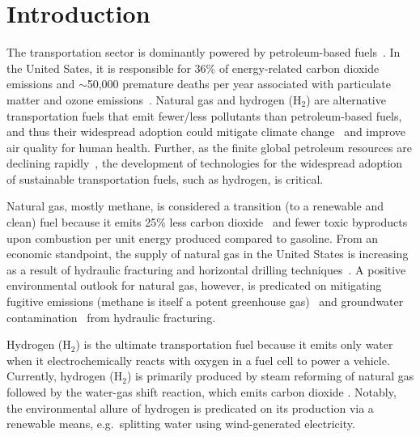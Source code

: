 \section{Introduction}
The transportation sector is dominantly powered by petroleum-based
fuels~\cite{davis2009transportation}. In the United Sates, it is responsible
for 36\% of energy-related carbon dioxide emissions \cite{useia} and $\sim$50,000
premature deaths per year associated with particulate matter and ozone
emissions~\cite{caiazzo2013air}. Natural gas and hydrogen (H$_2$) are
alternative transportation fuels that emit fewer/less pollutants than
petroleum-based fuels, and thus their widespread adoption could mitigate
climate change~\cite{mcglade2015geographical} and improve air quality for human
health. Further, as the finite global petroleum resources are declining
rapidly~\cite{sorrell2010global}, the development of technologies for the
widespread adoption of sustainable transportation fuels, such as hydrogen, is
critical.

Natural gas, mostly methane, is considered a transition (to a renewable and
clean) fuel because it emits 25\% less carbon dioxide~\cite{eia2013much} and
fewer toxic byproducts~\cite{wang2000full} upon combustion per unit energy
produced compared to gasoline. From an economic standpoint, the supply of
natural gas in the United States is increasing as a result of hydraulic
fracturing and horizontal drilling techniques~\cite{usnatgassupply}. A positive
environmental outlook for natural gas, however, is predicated on mitigating
fugitive emissions (methane is itself a potent greenhouse
gas)~\cite{alvarez2012greater} and groundwater
contamination~\cite{osborn2011methane} from hydraulic fracturing.

Hydrogen (H$_2$) is the ultimate transportation fuel because it emits only
water when it electrochemically reacts with oxygen in a fuel cell to power a
vehicle. Currently, hydrogen (H$_2$) is primarily produced by steam reforming
of natural gas followed by the water-gas shift reaction, which emits carbon
dioxide \cite{crabtree2004hydrogen}. Notably, the environmental allure of
hydrogen is predicated on its production via a renewable means, e.g.\ splitting
water using wind-generated electricity.


